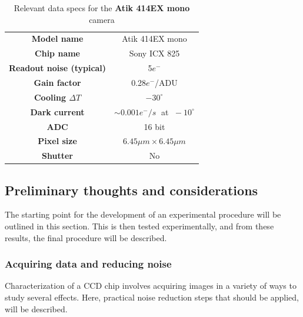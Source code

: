 \documentclass[../main.tex]{subfiles}
\begin{document}
		\begin{table}[]
			\centering
			\begin{tabular}{|c|c|}
				\hline
				\textbf{Model name }& Atik 414EX mono \\
				\textbf{Chip name}& Sony ICX 825\\
				\textbf{Readout noise (typical)}& 5$e^-$\\
				\textbf{Gain factor}& 0.28$e^-$/ADU\\
				\textbf{Cooling $\Delta T$}& $-30^\circ$\\
				\textbf{Dark current}& $\sim 0.001 e^- / s\;$ at $\;-10^\circ$ \\
				\textbf{ADC}& 16 bit\\
				\textbf{Pixel size}& $6.45 \mu m \times 6.45 \mu m$\\ 
				\textbf{Shutter}&No\\
				\hline
			\end{tabular}
		\caption{Relevant data specs for the \textbf{Atik 414EX mono} camera \cite{atik414specs}}\label{table:testcam}
		\end{table}
			
		\subsection{Preliminary thoughts and considerations}
		The starting point for the development of an experimental procedure will be outlined in this section. This is then tested experimentally, and from these results, the final procedure will be described. 
		
		\subsubsection{Acquiring data and reducing noise}
		Characterization of a CCD chip involves acquiring images in a variety of ways to study several effects. Here, practical noise reduction steps that should be applied, will be described. 
		
\end{document}
